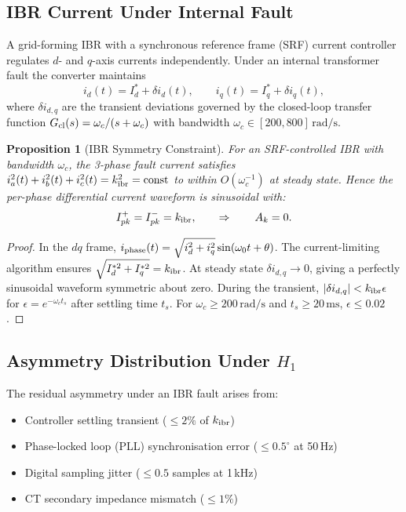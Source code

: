 \documentclass[11pt, a4paper]{article}
\newtheorem{proposition}{Proposition}
\newcommand{\Ak}{A_k}
\newcommand{\ms}{\,\text{ms}}
\begin{document}
\subsection{IBR Current Under Internal Fault}

A grid-forming IBR with a synchronous reference frame (SRF) current controller
regulates $d$- and $q$-axis currents independently.  Under an internal
transformer fault the converter maintains
\begin{equation}
  i_d(t) = I_d^* + \delta i_d(t), \qquad i_q(t) = I_q^* + \delta i_q(t),
  \label{eq:ibr_dq}
\end{equation}
where $\delta i_{d,q}$ are the transient deviations governed by the
closed-loop transfer function
$G_{\rm cl}(s) = \omega_c / (s + \omega_c)$ with bandwidth
$\omega_c \in [200, 800]\,\text{rad/s}$.

\begin{proposition}[IBR Symmetry Constraint]
\label{prop:ibr_symmetry}
For an SRF-controlled IBR with bandwidth $\omega_c$, the 3-phase fault current
satisfies $i_a^2(t) + i_b^2(t) + i_c^2(t) = k_{\rm ibr}^2 = \text{const}$
to within $O(\omega_c^{-1})$ at steady state.  Hence the per-phase differential
current waveform is sinusoidal with:
\begin{equation}
  I^+_{pk} = I^-_{pk} = k_{\rm ibr}, \qquad \Rightarrow \qquad \Ak = 0.
  \label{eq:ibr_symmetry}
\end{equation}
\end{proposition}
\begin{proof}
In the $dq$ frame, $i_{\rm phase}(t) = \sqrt{i_d^2 + i_q^2}\sin(\omega_0 t + \theta)$.
The current-limiting algorithm ensures $\sqrt{I_d^{*2} + I_q^{*2}} = k_{\rm ibr}$.
At steady state $\delta i_{d,q} \to 0$, giving a perfectly sinusoidal waveform
symmetric about zero.  During the transient, $|\delta i_{d,q}| < k_{\rm ibr}\epsilon$
for $\epsilon = e^{-\omega_c t_s}$ after settling time $t_s$.  For
$\omega_c \geq 200\,\text{rad/s}$ and $t_s \geq 20\ms$, $\epsilon \leq 0.02$.
\end{proof}

\subsection{Asymmetry Distribution Under $H_1$}

The residual asymmetry under an IBR fault arises from:
\begin{itemize}
  \item Controller settling transient ($\leq 2\%$ of $k_{\rm ibr}$)
  \item Phase-locked loop (PLL) synchronisation error ($\leq 0.5^\circ$ at 50\,Hz)
  \item Digital sampling jitter ($\leq 0.5$ samples at 1\,kHz)
  \item CT secondary impedance mismatch ($\leq 1\%$)
\end{itemize}
\end{document}
